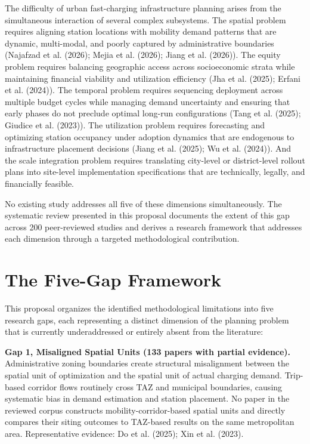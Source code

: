 \documentclass[letterpaper, 12pt, oneside, doublespacing]{Thesis}
\begin{document}
The difficulty of urban fast-charging infrastructure planning arises from the simultaneous interaction of several complex subsystems. The spatial problem requires aligning station locations with mobility demand patterns that are dynamic, multi-modal, and poorly captured by administrative boundaries (Najafzad et al. (2026); Mejia et al. (2026); Jiang et al. (2026)). The equity problem requires balancing geographic access across socioeconomic strata while maintaining financial viability and utilization efficiency (Jha et al. (2025); Erfani et al. (2024)). The temporal problem requires sequencing deployment across multiple budget cycles while managing demand uncertainty and ensuring that early phases do not preclude optimal long-run configurations (Tang et al. (2025); Giudice et al. (2023)). The utilization problem requires forecasting and optimizing station occupancy under adoption dynamics that are endogenous to infrastructure placement decisions (Jiang et al. (2025); Wu et al. (2024)). And the scale integration problem requires translating city-level or district-level rollout plans into site-level implementation specifications that are technically, legally, and financially feasible.

No existing study addresses all five of these dimensions simultaneously. The systematic review presented in this proposal documents the extent of this gap across 200 peer-reviewed studies and derives a research framework that addresses each dimension through a targeted methodological contribution.

\section{The Five-Gap Framework}

This proposal organizes the identified methodological limitations into five research gaps, each representing a distinct dimension of the planning problem that is currently underaddressed or entirely absent from the literature:


\noindent \textbf{Gap 1, Misaligned Spatial Units (133 papers with partial evidence).} Administrative zoning boundaries create structural misalignment between the spatial unit of optimization and the spatial unit of actual charging demand. Trip-based corridor flows routinely cross TAZ and municipal boundaries, causing systematic bias in demand estimation and station placement. No paper in the reviewed corpus constructs mobility-corridor-based spatial units and directly compares their siting outcomes to TAZ-based results on the same metropolitan area. Representative evidence: Do et al. (2025); Xin et al. (2023).
\end{document}
